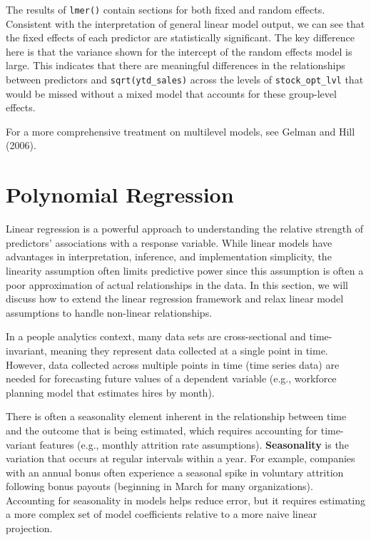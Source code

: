 \documentclass[
]{book}
\begin{document}
The results of \texttt{lmer()} contain sections for both fixed and random effects. Consistent with the interpretation of general linear model output, we can see that the fixed effects of each predictor are statistically significant. The key difference here is that the variance shown for the intercept of the random effects model is large. This indicates that there are meaningful differences in the relationships between predictors and \texttt{sqrt(ytd\_sales)} across the levels of \texttt{stock\_opt\_lvl} that would be missed without a mixed model that accounts for these group-level effects.

For a more comprehensive treatment on multilevel models, see Gelman and Hill (2006).

\hypertarget{polynomial-regression}{%
\section{Polynomial Regression}\label{polynomial-regression}}

Linear regression is a powerful approach to understanding the relative strength of predictors' associations with a response variable. While linear models have advantages in interpretation, inference, and implementation simplicity, the linearity assumption often limits predictive power since this assumption is often a poor approximation of actual relationships in the data. In this section, we will discuss how to extend the linear regression framework and relax linear model assumptions to handle non-linear relationships.

In a people analytics context, many data sets are cross-sectional and time-invariant, meaning they represent data collected at a single point in time. However, data collected across multiple points in time (time series data) are needed for forecasting future values of a dependent variable (e.g., workforce planning model that estimates hires by month).

There is often a seasonality element inherent in the relationship between time and the outcome that is being estimated, which requires accounting for time-variant features (e.g., monthly attrition rate assumptions). \textbf{Seasonality} is the variation that occurs at regular intervals within a year. For example, companies with an annual bonus often experience a seasonal spike in voluntary attrition following bonus payouts (beginning in March for many organizations). Accounting for seasonality in models helps reduce error, but it requires estimating a more complex set of model coefficients relative to a more naive linear projection.
\end{document}
